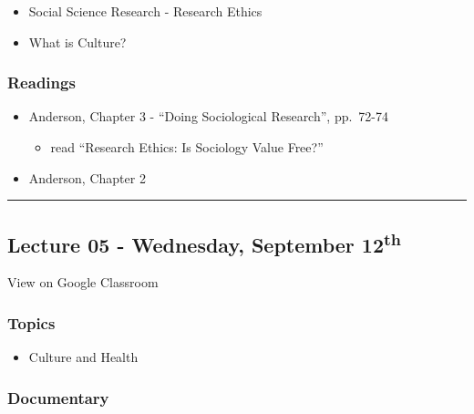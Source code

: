 \documentclass[]{book}
\providecommand{\tightlist}{%
  \setlength{\itemsep}{0pt}\setlength{\parskip}{0pt}}
\theoremstyle{definition}
\theoremstyle{definition}
\theoremstyle{definition}
\theoremstyle{remark}
\begin{document}
\begin{itemize}
\tightlist
\item
  Social Science Research - Research Ethics
\item
  What is Culture?
\end{itemize}

\hypertarget{readings-4}{%
\subsubsection*{Readings}\label{readings-4}}

\begin{itemize}
\tightlist
\item
  Anderson, Chapter 3 - ``Doing Sociological Research'', pp.~72-74

  \begin{itemize}
  \tightlist
  \item
    read ``Research Ethics: Is Sociology Value Free?''
  \end{itemize}
\item
  Anderson, Chapter 2
\end{itemize}

\begin{center}\rule{0.5\linewidth}{\linethickness}\end{center}

\hypertarget{lecture-05---wednesday-september-12th}{%
\subsection*{\texorpdfstring{Lecture 05 - Wednesday, September
12\textsuperscript{th}}{Lecture 05 - Wednesday, September 12th}}\label{lecture-05---wednesday-september-12th}}

View on Google Classroom

\hypertarget{topics-5}{%
\subsubsection*{Topics}\label{topics-5}}

\begin{itemize}
\tightlist
\item
  Culture and Health
\end{itemize}

\hypertarget{documentary-1}{%
\subsubsection*{Documentary}\label{documentary-1}}
\end{document}
